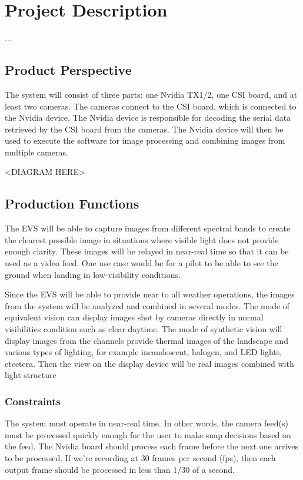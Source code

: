 \documentclass[]{report}
\begin{document}
\section{Project Description}
...
\subsection{Product Perspective}
The system will consist of three parts: one Nvidia TX1/2, one CSI board, and at least two cameras. The cameras connect to the CSI board, which is connected to the Nvidia device. The Nvidia device is responsible for decoding the serial data retrieved by the CSI board from the cameras. The Nvidia device will then be used to execute the software for image processing and combining images from multiple cameras.

<DIAGRAM HERE>

\subsection{Production Functions}
The EVS will be able to capture images from different spectral bands to create the clearest possible image in situations where visible light does not provide enough clarity. These images will be relayed in near-real time so that it can be used as a video feed. One use case would be for a pilot to be able to see the ground when landing in low-visibility conditions.

Since the EVS will be able to provide near to all weather operations, the images from the system will be analyzed and combined in several modes. The mode of equivalent vision can display images shot by cameras directly in normal visibilities condition such as clear daytime. The mode of synthetic vision will display images from the channels provide thermal images of the landscape and various types of lighting, for example incandescent, halogen, and LED lights, etcetera. Then the view on the display device will be real images combined with light structure

\subsubsection{Constraints}
The system must operate in near-real time. In other words, the camera feed(s) must be processed quickly enough for the user to make snap decisions based on the feed. The Nvidia board should process each frame before the next one arrives to be processed. If we’re recording at 30 frames per second (fps), then each output frame should be processed in less than 1/30 of a second.
\end{document}
